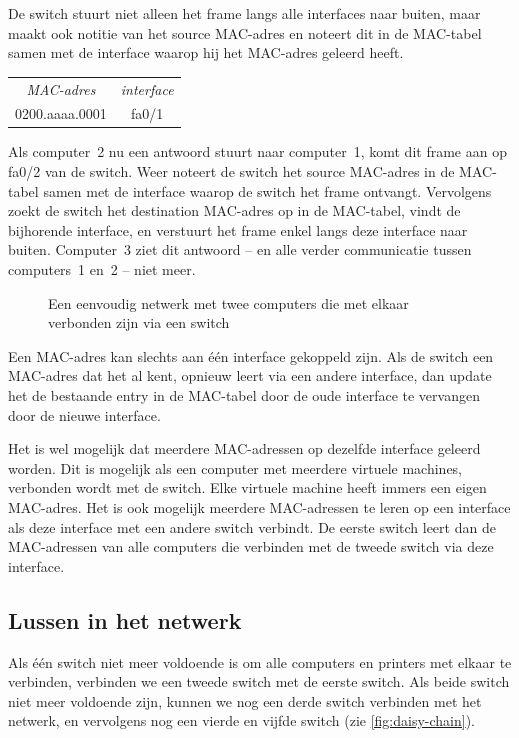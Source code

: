 De switch stuurt niet alleen het frame langs alle interfaces naar buiten, maar maakt ook notitie van het source MAC-adres en noteert dit in de MAC-tabel samen met de interface waarop hij het MAC-adres geleerd heeft.
\begin{center}
\begin{tabular}{cc}
\textit{MAC-adres} & \textit{interface} \\[1ex]
0200.aaaa.0001 & fa0/1\\
\end{tabular}
\end{center}
Als computer~2 nu een antwoord stuurt naar computer~1, komt dit frame aan op fa0/2 van de switch.
Weer noteert de switch het source MAC-adres in de MAC-tabel samen met de interface waarop de switch het frame ontvangt.
Vervolgens zoekt de switch het destination MAC-adres op in de MAC-tabel, vindt de bijhorende interface, en verstuurt het frame enkel langs deze interface naar buiten.
Computer~3 ziet dit antwoord -- en alle verder communicatie tussen computers~1 en~2 -- niet meer.

\begin{figure}
    \centering
    
    \caption{Een eenvoudig netwerk met twee computers die met elkaar verbonden zijn via een switch}
    \label{fig:simple-lan}
\end{figure}

Een MAC-adres kan slechts aan één interface gekoppeld zijn.
Als de switch een MAC-adres dat het al kent, opnieuw leert via een andere interface, dan update het de bestaande entry in de MAC-tabel door de oude interface te vervangen door de nieuwe interface.

Het is wel mogelijk dat meerdere MAC-adressen op dezelfde interface geleerd worden.
Dit is mogelijk als een computer met meerdere virtuele machines, verbonden wordt met de switch.
Elke virtuele machine heeft immers een eigen MAC-adres.
Het is ook mogelijk meerdere MAC-adressen te leren op een interface als deze interface met een andere switch verbindt.
De eerste switch leert dan de MAC-adressen van alle computers die verbinden met de tweede switch via deze interface.


\subsection{Lussen in het netwerk}
\label{sec:stp}

Als één switch niet meer voldoende is om alle computers en printers met elkaar te verbinden, verbinden we een tweede switch met de eerste switch.
Als beide switch niet meer voldoende zijn, kunnen we nog een derde switch verbinden met het netwerk, en vervolgens nog een vierde en vijfde switch (zie \vref{fig:daisy-chain}).


